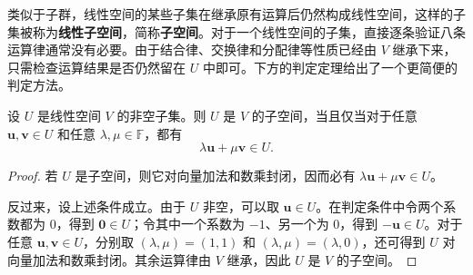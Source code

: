 

类似于子群，线性空间的某些子集在继承原有运算后仍然构成线性空间，这样的子集被称为\textbf{线性子空间}，简称\textbf{子空间}。对于一个线性空间的子集，直接逐条验证八条运算律通常没有必要。由于结合律、交换律和分配律等性质已经由 \(V\) 继承下来，只需检查运算结果是否仍然留在 \(U\) 中即可。下方的判定定理给出了一个更简便的判定方法。

\begin{theorem}[子空间判定定理]
    \label{thm_subspace_criterion}
    设 \(U\) 是线性空间 \(V\) 的非空子集。则 \(U\) 是 \(V\) 的子空间，当且仅当对于任意 \(\bm u,\bm v\in U\) 和任意 \(\lambda,\mu\in\mathbb F\)，都有
    \[
        \lambda\bm u+\mu\bm v\in U.
    \]
\end{theorem}

\begin{proof}
    若 \(U\) 是子空间，则它对向量加法和数乘封闭，因而必有 \(\lambda\bm u+\mu\bm v\in U\)。

    反过来，设上述条件成立。由于 \(U\) 非空，可以取 \(\bm u\in U\)。在判定条件中令两个系数都为 \(0\)，得到 \(\bm 0\in U\)；令其中一个系数为 \(-1\)、另一个为 \(0\)，得到 \(-\bm u\in U\)。对于任意 \(\bm u,\bm v\in U\)，分别取 \((\lambda,\mu)=(1,1)\) 和 \((\lambda,\mu)=(\lambda,0)\)，还可得到 \(U\) 对向量加法和数乘封闭。其余运算律由 \(V\) 继承，因此 \(U\) 是 \(V\) 的子空间。
\end{proof}

